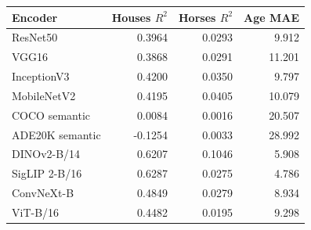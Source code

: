 \begin{tabular}{lrrr}
\toprule
Encoder & Houses $R^2$ & Horses $R^2$ & Age MAE\\
\midrule
ResNet50 & 0.3964 & 0.0293 & 9.912\\
VGG16 & 0.3868 & 0.0291 & 11.201\\
InceptionV3 & 0.4200 & 0.0350 & 9.797\\
MobileNetV2 & 0.4195 & 0.0405 & 10.079\\
COCO semantic & 0.0084 & 0.0016 & 20.507\\
ADE20K semantic & -0.1254 & 0.0033 & 28.992\\
DINOv2-B/14 & 0.6207 & 0.1046 & 5.908\\
SigLIP 2-B/16 & 0.6287 & 0.0275 & 4.786\\
ConvNeXt-B & 0.4849 & 0.0279 & 8.934\\
ViT-B/16 & 0.4482 & 0.0195 & 9.298\\
\bottomrule
\end{tabular}
